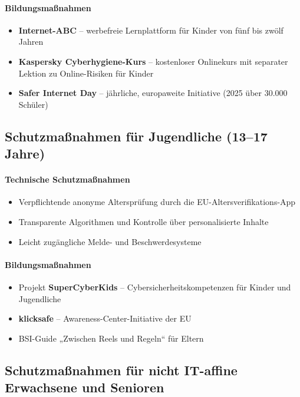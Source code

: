 \documentclass[11pt,a4paper]{article}
\begin{document}
	\paragraph{Bildungsmaßnahmen}
	\begin{itemize}
		\item \textbf{Internet-ABC} -- werbefreie Lernplattform für Kinder von fünf bis zwölf Jahren \cite{internetabc}
		\item \textbf{Kaspersky Cyberhygiene-Kurs} -- kostenloser Onlinekurs mit separater Lektion zu Online-Risiken für Kinder \cite{kaspersky2025}
		\item \textbf{Safer Internet Day} -- jährliche, europaweite Initiative (2025 über 30.000 Schüler) \cite{sid2025}
	\end{itemize}
	
	\subsection{Schutzmaßnahmen für Jugendliche (13--17 Jahre)}
	
	\paragraph{Technische Schutzmaßnahmen}
	\begin{itemize}
		\item Verpflichtende anonyme Altersprüfung durch die EU-Altersverifikations-App
		\item Transparente Algorithmen und Kontrolle über personalisierte Inhalte
		\item Leicht zugängliche Melde- und Beschwerdesysteme
	\end{itemize}
	
	\paragraph{Bildungsmaßnahmen}
	\begin{itemize}
		\item Projekt \textbf{SuperCyberKids} -- Cybersicherheitskompetenzen für Kinder und Jugendliche
		\item \textbf{klicksafe} -- Awareness-Center-Initiative der EU \cite{klicksafe}
		\item BSI-Guide „Zwischen Reels und Regeln“ für Eltern
	\end{itemize}
	
	\subsection{Schutzmaßnahmen für nicht IT-affine Erwachsene und Senioren}
	
\end{document}
